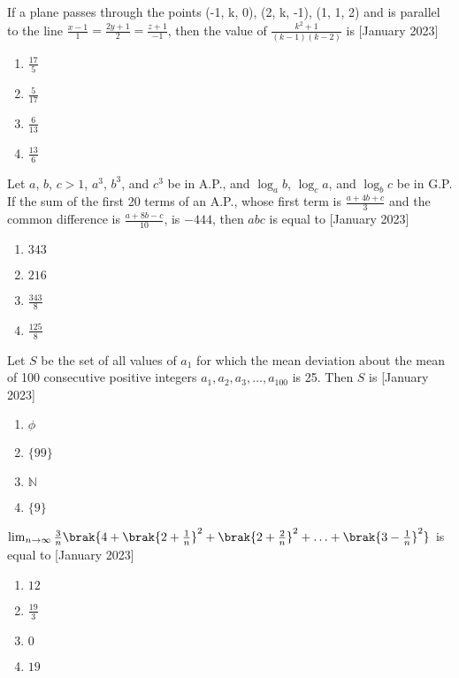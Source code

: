 \iffalse
\title{January 2023}
\author{AI24BTECH11012}
\section{mcq-single}
\fi
    \item If a plane passes through the points (-1, k, 0), (2, k, -1), (1, 1, 2) and is parallel to the line $\frac{x-1}{1} = \frac{2y+1}{2} = \frac{z+1}{-1}$, then the value of $\frac{k^2+1}{(k-1)(k-2)}$ is
    \hfill{[January 2023]}
    \begin{enumerate}
        \item $\frac{17}{5}$
        \item $\frac{5}{17}$
        \item $\frac{6}{13}$
        \item $\frac{13}{6}$
    \end{enumerate}
    
    \item Let $a$, $b$, $c > 1$, $a^3$, $b^3$, and $c^3$ be in A.P., and $\log_ab$, $\log_ca$, and $\log_bc$ be in G.P. If the sum of the first 20 terms of an A.P., whose first term is $\frac{a+4b+c}{3}$ and the common difference is $\frac{a+8b-c}{10}$, is $-444$, then $abc$ is equal to
    \hfill{[January 2023]}
    \begin{enumerate}
        \item $343$
        \item $216$
        \item $\frac{343}{8}$
        \item $\frac{125}{8}$
    \end{enumerate}

    \item Let $S$ be the set of all values of $a_1$ for which the mean deviation about the mean of 100 consecutive positive integers $a_1, a_2, a_3, \dots, a_{100}$ is 25. Then $S$ is
    \hfill{[January 2023]}
    \begin{enumerate}
        \item $\phi$
        \item $\{99\}$
        \item $\mathbb{N}$
        \item $\{9\}$
    \end{enumerate}

    \item $\lim_{n \to \infty} \frac{3}{n}\brak{4+\brak{2+\frac{1}{n}}^2+\brak{2+\frac{2}{n}}^2 + \ldots + \brak{3-\frac{1}{n}}^2}$ is equal to
    \hfill{[January 2023]}
    \begin{enumerate}
        \item $12$
        \item $\frac{19}{3}$
        \item $0$
        \item $19$
    \end{enumerate}

